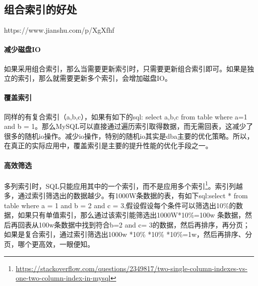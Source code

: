 \documentclass[../../../interview-questions.tex]{subfiles}
\begin{document}
\subsection{组合索引的好处}

https://www.jianshu.com/p/XgXfhf

\paragraph{减少磁盘IO}如果采用组合索引，那么当需要更新索引时，只需要更新组合索引即可。如果是独立的索引，那么就需要更新多个索引，会增加磁盘IO。

\paragraph{覆盖索引}同样的有复合索引（a,b,c），如果有如下的sql: select a,b,c from table where a=1 and b = 1。那么MySQL可以直接通过遍历索引取得数据，而无需回表，这减少了很多的随机io操作。减少io操作，特别的随机io其实是dba主要的优化策略。所以，在真正的实际应用中，覆盖索引是主要的提升性能的优化手段之一。

\paragraph{高效筛选}

多列索引时，SQL只能应用其中的一个索引，而不是应用多个索引\footnote{\url{https://stackoverflow.com/questions/2349817/two-single-column-indexes-vs-one-two-column-index-in-mysql}}。索引列越多，通过索引筛选出的数据越少。有1000W条数据的表，有如下sql:select * from table where a = 1 and b = 2 and c = 3,假设假设每个条件可以筛选出10\%的数据，如果只有单值索引，那么通过该索引能筛选出1000W*10\%=100w 条数据，然后再回表从100w条数据中找到符合b=2 and c= 3的数据，然后再排序，再分页；如果是复合索引，通过索引筛选出1000w *10\% *10\% *10\%=1w，然后再排序、分页，哪个更高效，一眼便知。
\end{document}
